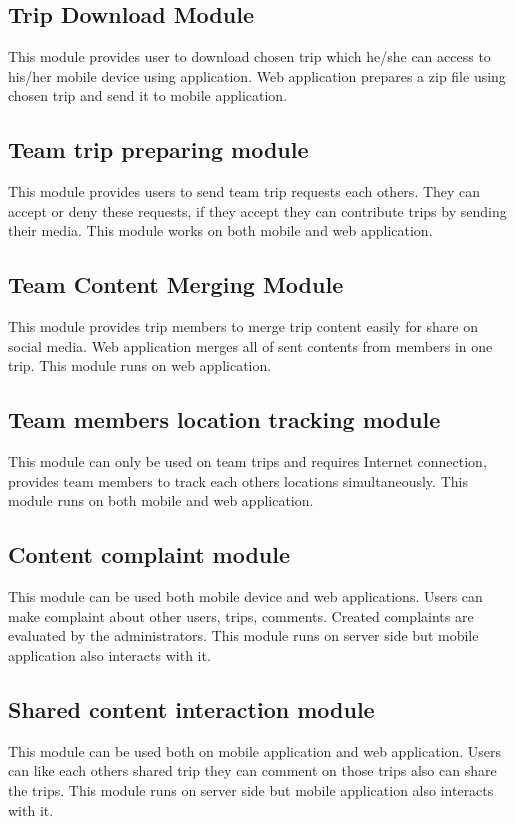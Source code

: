 \subsection{Trip Download Module}
This module provides user to download chosen trip  which he/she can access to his/her mobile device using application. Web application prepares a zip file using chosen trip and send it to mobile application.
\subsection{Team trip preparing module}
This module provides users to send team trip requests each others. They can accept or deny these requests, if they accept they can contribute trips by sending their media. This module works on both mobile and web application.

\subsection{Team Content Merging Module}
This module provides trip members to merge trip content easily for share on social media. Web application merges all of sent contents from members in one trip. This module runs on web application.

\subsection{Team members location tracking module}
This module can only be used on team trips and requires Internet connection, provides team members to track each others locations simultaneously. This module runs on both mobile  and web application.
   
\subsection{Content complaint module}   
This module can be used both mobile device and web applications. Users can make complaint about other users, trips, comments. Created complaints are evaluated by the administrators. This module runs on server side but mobile application also interacts with it.
    
\subsection{Shared content interaction module}    
This module can be used both on mobile application and web application. Users can like each others shared trip they can comment on those trips also can share the trips. This module runs on server side but mobile application also interacts with it.

